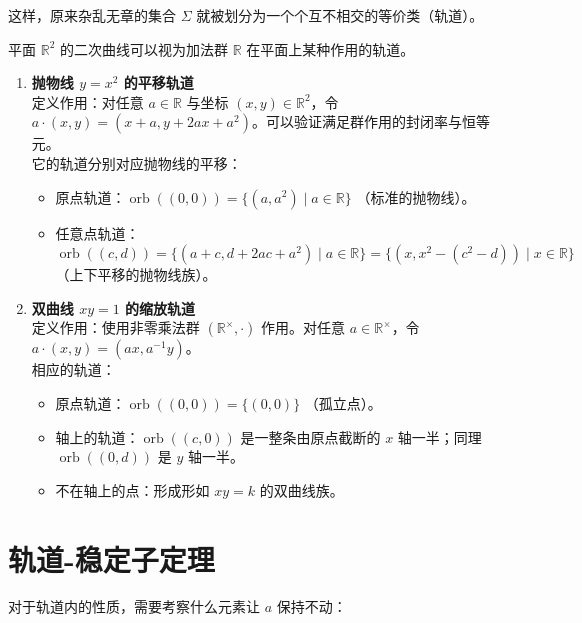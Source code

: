 \documentclass[11pt]{article}
\begin{document}
这样，原来杂乱无章的集合 $\Sigma$ 就被划分为一个个互不相交的等价类（轨道）。

\begin{cnexample}[二次曲线的群作用视角]
    平面 $\mathbb{R}^2$ 的二次曲线可以视为加法群 $\mathbb{R}$ 在平面上某种作用的轨道。
    \begin{enumerate}
        \item \textbf{抛物线 $y=x^2$ 的平移轨道} \\
        定义作用：对任意 $a \in \mathbb{R}$ 与坐标 $(x, y) \in \mathbb{R}^2$，令 $a \cdot (x, y) = (x+a, y+2ax+a^2)$。可以验证满足群作用的封闭率与恒等元。\\
        它的轨道分别对应抛物线的平移：
        \begin{itemize}
            \item 原点轨道：$\operatorname{orb}((0,0)) = \{ (a, a^2) \mid a \in \mathbb{R} \}$ （标准的抛物线）。
            \item 任意点轨道：$\operatorname{orb}((c,d)) = \{ (a+c, d+2ac+a^2) \mid a \in \mathbb{R} \} = \{ (x, x^2 - (c^2-d)) \mid x \in \mathbb{R} \}$ （上下平移的抛物线族）。
        \end{itemize}
        
        \item \textbf{双曲线 $xy=1$ 的缩放轨道} \\
        定义作用：使用非零乘法群 $(\mathbb{R}^{\times}, \cdot)$ 作用。对任意 $a \in \mathbb{R}^{\times}$，令 $a \cdot (x, y) = (ax, a^{-1}y)$。\\
        相应的轨道：
        \begin{itemize}
            \item 原点轨道：$\operatorname{orb}((0,0)) = \{(0,0)\}$ （孤立点）。
            \item 轴上的轨道：$\operatorname{orb}((c,0))$ 是一整条由原点截断的 $x$ 轴一半；同理 $\operatorname{orb}((0,d))$ 是 $y$ 轴一半。
            \item 不在轴上的点：形成形如 $xy=k$ 的双曲线族。
        \end{itemize}
    \end{enumerate}
\end{cnexample}

\section{轨道-稳定子定理}

对于轨道内的性质，需要考察什么元素让 $a$ 保持不动：
\end{document}
